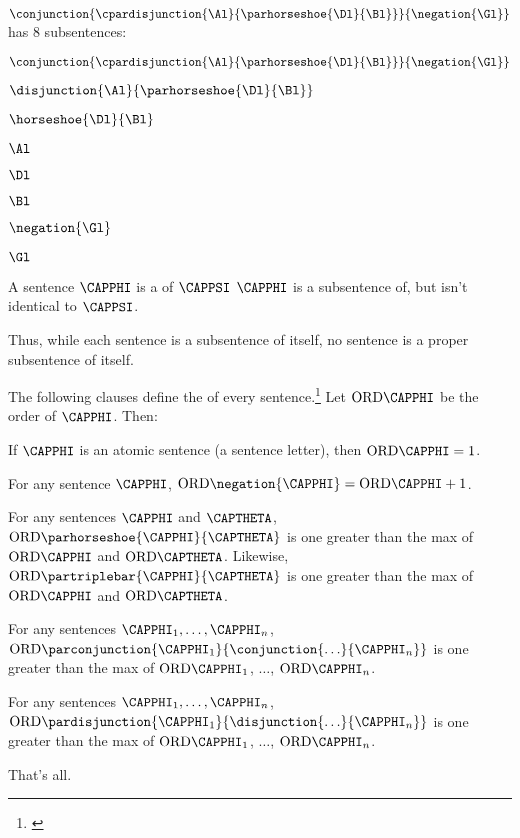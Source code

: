 \begin{majorILnc}{}
$\conjunction{\cpardisjunction{\Al}{\parhorseshoe{\Dl}{\Bl}}}{\negation{\Gl}}$ has 8 subsentences:
\begin{multicols}{2}
\begin{cenumerate}
\item $\conjunction{\cpardisjunction{\Al}{\parhorseshoe{\Dl}{\Bl}}}{\negation{\Gl}}$
\item $\disjunction{\Al}{\parhorseshoe{\Dl}{\Bl}}$
\item $\horseshoe{\Dl}{\Bl}$
\item $\Al$
\item $\Dl$
\item $\Bl$
\item $\negation{\Gl}$
\item $\Gl$
\end{cenumerate}
\end{multicols}
\end{majorILnc}
\begin{majorILnc}{}
	A sentence $\CAPPHI$ is a  of $\CAPPSI$ \Iff $\CAPPHI$ is a subsentence of, but isn't identical to $\CAPPSI$.
\end{majorILnc}
\noindent{}Thus, while each sentence is a subsentence of itself, no sentence is a proper subsentence of itself.
\begin{majorILnc}{}
The following clauses define the  of every \GSL{} sentence.\footnote{\citetext{\citealt{Post1921}, \citealt[11]{Hodges2001}}} Let $\ORD{\CAPPHI}$ be the order of $\CAPPHI$. Then: 
\begin{cenumerate}
\item If $\CAPPHI$ is an atomic sentence (a sentence letter), then $\ORD{\CAPPHI}=1$.
\item For any sentence $\CAPPHI$, $\ORD{\negation{\CAPPHI}}=\ORD{\CAPPHI}+1$.
\item For any sentences $\CAPPHI$ and $\CAPTHETA$, $\ORD{\parhorseshoe{\CAPPHI}{\CAPTHETA}}$ is one greater than the max of $\ORD{\CAPPHI}$ and $\ORD{\CAPTHETA}$. Likewise, $\ORD{\partriplebar{\CAPPHI}{\CAPTHETA}}$ is one greater than the max of $\ORD{\CAPPHI}$ and $\ORD{\CAPTHETA}$.
\item For any sentences $\CAPPHI_1,\ldots,\CAPPHI_\integer{n}$, $\ORD{\parconjunction{\CAPPHI_1}{\conjunction{\ldots}{\CAPPHI_\integer{n}}}}$ is one greater than the max of $\ORD{\CAPPHI_1}$, $\ldots$, $\ORD{\CAPPHI_\integer{n}}$.
\item For any sentences $\CAPPHI_1,\ldots,\CAPPHI_\integer{n}$, $\ORD{\pardisjunction{\CAPPHI_1}{\disjunction{\ldots}{\CAPPHI_\integer{n}}}}$ is one greater than the max of $\ORD{\CAPPHI_1}$, $\ldots$, $\ORD{\CAPPHI_\integer{n}}$. 
\item That's all.
\end{cenumerate}
\end{majorILnc}
